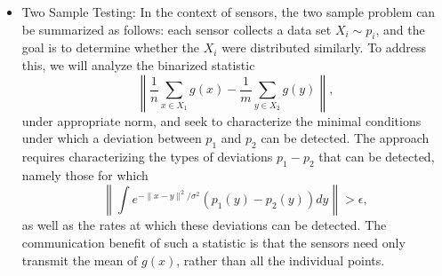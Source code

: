 \documentclass{article}
\newcommand{\comment}[3]{{\color{#1} {\bf #2 :} #3}}
\newcommand{\yoav}[1]{\comment{magenta}{Yoav}{#1}}
\newcommand{\rayan}[1]{\comment{red}{Rayan}{#1}}
\begin{document}
\begin{itemize}
\item Two Sample Testing: 
In the context of sensors, the two sample problem can be summarized as follows: each sensor collects a data set $X_i\sim p_i$, and the goal is to determine whether the $X_i$ were distributed similarly.  %
To address this, we will analyze the binarized statistic $$\left\|\frac{1}{n}\sum_{x\in X_1} g(x) - \frac{1}{m}\sum_{y\in X_2} g(y)\right\|,$$
under appropriate norm, and seek to characterize the minimal conditions under which a deviation between $p_1$ and $p_2$ can be detected.   The approach requires characterizing the types of deviations $p_1 - p_2$ that can be detected, namely those for which $$\left\|\int e^{-\|x-y\|^2/\sigma^2} (p_1(y) - p_2(y)) dy \right\| > \epsilon,$$ as well as the rates at which these deviations can be detected.
The communication benefit of such a statistic is that the sensors need
only transmit the mean of $g(x)$, rather than all the individual
points.  %


\end{itemize}
\end{document}
